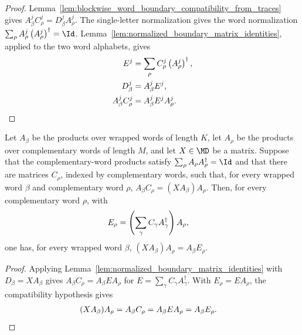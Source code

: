 \begin{proof}
    \leanok
    Lemma~\ref{lem:blockwise_word_boundary_compatibility_from_traces} gives
    $A^j_\beta C^j_\rho = D^j_\beta A^j_\rho$.
    The single-letter normalization gives the word normalization
    $\sum_\rho A^j_\rho\left(A^j_\rho\right)^\dagger = \Id$.
    Lemma~\ref{lem:normalized_boundary_matrix_identities}, applied to the
    two word alphabets, gives
    \begin{align}
        E^j
         & =
        \sum_\rho C^j_\rho\left(A^j_\rho\right)^\dagger,
        \notag \\
        D^j_\beta
         & =
        A^j_\beta E^j,
        \notag \\
        A^j_\beta C^j_\rho
         & =
        A^j_\beta E^jA^j_\rho.
        \notag
    \end{align}
\end{proof}

\begin{lemma}
    \label{lem:complementary_word_boundary_identities_from_pgvwc}
    \leanok
    Let $A_\beta$ be the products over wrapped words of length $K$, let
    $A_\rho$ be the products over complementary words of length $M$, and let
    $X\in\MD$ be a matrix. Suppose that the complementary-word products
    satisfy
    $\sum_\rho A_\rho A_\rho^\dagger = \Id$
    and that there are matrices $C_\rho$, indexed by complementary words,
    such that, for every wrapped word $\beta$ and complementary word $\rho$,
    $A_\beta C_\rho = (X A_\beta)A_\rho$.
    Then, for every complementary word $\rho$, with
    \begin{align}
        E_\rho
         & =
        \left(\sum_\gamma C_\gamma A_\gamma^\dagger\right)A_\rho,
        \notag
    \end{align}
    one has, for every wrapped word $\beta$,
    $(X A_\beta)A_\rho = A_\beta E_\rho$.
\end{lemma}

\begin{proof}
    \leanok
    Applying Lemma~\ref{lem:normalized_boundary_matrix_identities} with
    $D_\beta=X A_\beta$ gives
    $A_\beta C_\rho = A_\beta E A_\rho$
    for $E=\sum_\gamma C_\gamma A_\gamma^\dagger$. With $E_\rho=EA_\rho$,
    the compatibility hypothesis gives
    \begin{align}
        (X A_\beta)A_\rho
         & =
        A_\beta C_\rho =
        A_\beta E A_\rho =
        A_\beta E_\rho.
        \notag
    \end{align}
\end{proof}

